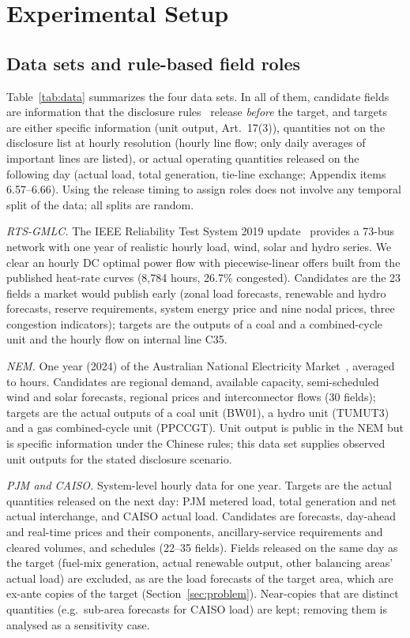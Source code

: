 \section{Experimental Setup}\label{sec:setup}

\subsection{Data sets and rule-based field roles}\label{sec:data}
Table~\ref{tab:data} summarizes the four data sets. In all of them, candidate fields are
information that the disclosure rules~\cite{nea2024disclosure} release \emph{before} the
target, and targets are either specific information (unit output, Art.~17(3)), quantities not on
the disclosure list at hourly resolution (hourly line flow; only daily averages of important
lines are listed), or actual operating quantities released on the following day (actual load,
total generation, tie-line exchange; Appendix items 6.57--6.66). Using the release timing to
assign roles does not involve any temporal split of the data; all splits are random.

\emph{RTS-GMLC.} The IEEE Reliability Test System 2019 update~\cite{barrows2020rts} provides a
73-bus network with one year of realistic hourly load, wind, solar and hydro series. We clear
an hourly DC optimal power flow with piecewise-linear offers built from the published heat-rate
curves (8,784 hours, 26.7\% congested). Candidates are the 23 fields a market would publish
early (zonal load forecasts, renewable and hydro forecasts, reserve requirements, system energy
price and nine nodal prices, three congestion indicators); targets are the outputs of a coal and
a combined-cycle unit and the hourly flow on internal line C35.

\emph{NEM.} One year (2024) of the Australian National Electricity Market~\cite{aemo2024nemweb},
averaged to hours. Candidates are regional demand, available capacity, semi-scheduled wind and
solar forecasts, regional prices and interconnector flows (30 fields); targets are the actual
outputs of a coal unit (BW01), a hydro unit (TUMUT3) and a gas combined-cycle unit (PPCCGT).
Unit output is public in the NEM but is specific information under the Chinese rules; this data set supplies observed unit outputs for the stated disclosure scenario.

\emph{PJM and CAISO.} System-level hourly data for one year. Targets are the actual quantities
released on the next day: PJM metered load, total generation and net actual interchange, and
CAISO actual load. Candidates are forecasts, day-ahead and real-time prices and their
components, ancillary-service requirements and cleared volumes, and schedules (22--35 fields).
Fields released on the same day as the target (fuel-mix generation, actual renewable output,
other balancing areas' actual load) are excluded, as are the load forecasts of the target area,
which are ex-ante copies of the target (Section~\ref{sec:problem}). Near-copies that are distinct
quantities (e.g.\ sub-area forecasts for CAISO load) are kept; removing them is analysed as a
sensitivity case.


